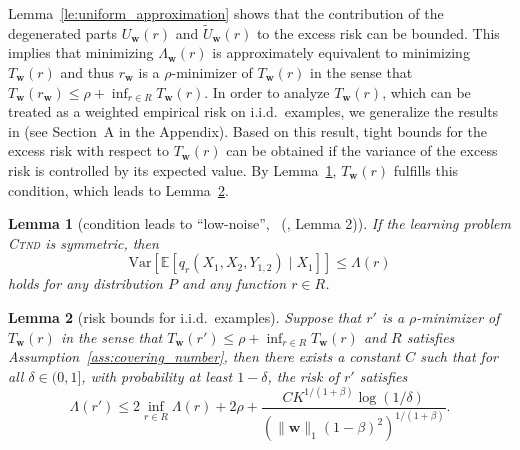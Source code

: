 \documentclass[letterpaper]{article} %
\newtheorem{lemma}{Lemma}
\newcommand{\E}{\mathbb{E}}
\newcommand{\Var}{\text{Var}}
\newcommand{\weight}{\mathbf{w}}
\newcommand{\distribution}{P}
\newcommand{\problemabbr}{\textnormal{C}\textsc{tnd}}
\newcommand{\normo}[1]{\|#1\|_1}
\newcommand{\complexbound}{\beta}
\newcommand{\citett}[2]{\citeauthor{#2}\ (\citeyear{#2}, #1)}
\begin{document}
Lemma~\ref{le:uniform_approximation} shows that the contribution of the degenerated parts $U_\weight{}(r)$ and $\widetilde{U}_\weight{}(r)$ to the excess risk can be bounded. 
This implies that minimizing $\Lambda_\weight{}(r)$ is approximately equivalent to minimizing $T_\weight{}(r)$ and thus $r_\weight{}$ is a $\rho$-minimizer of $T_\weight{}(r)$ in the sense that $T_\weight{}(r_\weight{})\le \rho+\inf_{r\in R}T_\weight{}(r)$.
In order to analyze $T_\weight{}(r)$, which can be treated as a weighted empirical risk on i.i.d.\ examples, we generalize the results in \cite{Massart2006} (see Section~A in the Appendix). 
Based on this result, tight bounds for the excess risk with respect to $T_\weight{}(r)$
can be obtained if the variance of the excess risk is controlled by its expected value.
By Lemma~\ref{le:variant_control}, $T_\weight{}(r)$ fulfills this condition, which leads to Lemma~\ref{le:risk_bounds_iid}.

\begin{lemma}[condition leads to ``low-noise'', {\citett{Lemma 2}{papa2016graph}}]
    \label{le:variant_control}
    If the learning problem \problemabbr{} is symmetric, then
    \begin{equation}
        \label{eq:variant_control}
        \Var\left[\E[q_r(X_1,X_2,Y_{1,2})\mid X_1]\right]\le \Lambda(r) 
    \end{equation}
    holds for any distribution $\distribution$ and any function $r\in R$.
\end{lemma}

\begin{lemma}[risk bounds for i.i.d.\ examples]
\label{le:risk_bounds_iid}
  Suppose that $r'$ is a $\rho$-minimizer of $T_\weight{}(r)$ in the sense that $T_\weight{}(r')\le \rho + \inf_{r\in R}T_\weight{}(r)$ and $R$ satisfies Assumption~\ref{ass:covering_number}, then there exists a constant $C$ such that for all $\delta\in(0,1]$, with probability at least $1-\delta$, the risk of $r'$ satisfies
  \[\Lambda(r')\le 2\inf_{r\in R}\Lambda(r)+2\rho+\frac{CK^{1/(1+\complexbound{})}\log(1/\delta)}{(\normo{\weight{}}(1-\complexbound{})^2)^{1/(1+\complexbound{})}}.\]
\end{lemma}
\end{document}
